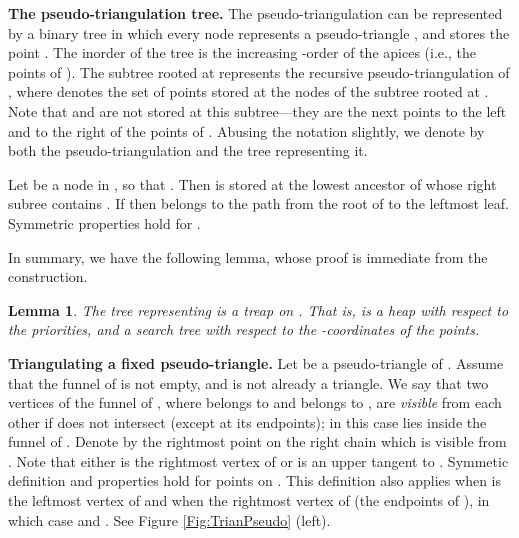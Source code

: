 \documentclass[11pt]{article}
\newtheorem{lemma}[theorem]{Lemma}
\begin{document}
\medskip
\noindent
{\bf The pseudo-triangulation tree.}
The pseudo-triangulation  can be represented by a binary
tree in which every node  represents a pseudo-triangle , and stores the point . The inorder
of the tree is the increasing -order of the apices (i.e., the points of ). The subtree
rooted at  represents the recursive pseudo-triangulation of
, where  denotes the set of points stored at the nodes of the subtree rooted
at . Note that  and  are not stored
at this subtree---they are the next points to the left and to the
right of the points of .
Abusing the notation slightly, we denote by  both the
pseudo-triangulation  and the tree
representing it.

\medskip
{}
Let  be a node in , so that . Then  is stored at the lowest ancestor of  whose right subree contains . If  then  belongs to the path from the root of  to the leftmost leaf. Symmetric properties hold for . 


In summary, we have the following lemma, whose proof is immediate from the construction.
\begin{lemma}\label{Lemma:treap}
  The tree representing  is a treap on . That is,
   is a heap with respect to the \textit{priorities}, and
  a search tree with respect to the -coordinates of the points.
\end{lemma}

\noindent
{\bf Triangulating a fixed pseudo-triangle.}
Let  be a pseudo-triangle of . Assume that the funnel of
 is not empty, and is not already a triangle. We say that two
vertices  of the funnel of , where  belongs to  and 
belongs to , are \textit{visible} from each other if 
does not intersect  (except at its endpoints); in this
case  lies inside the funnel of . Denote by  the
rightmost point on the right chain which is visible from
. Note that either  is the
rightmost vertex of  or  is an upper tangent to
. Symmetic definition and properties hold for points  on
. This definition also applies when  is the leftmost vertex of
 and when  the rightmost vertex of  (the endpoints of ), in which case  and . See Figure \ref{Fig:TrianPseudo} (left).
\end{document}
